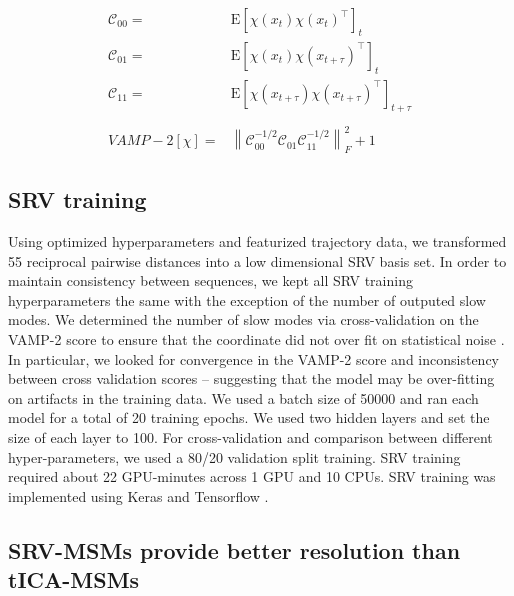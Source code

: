 \documentclass[journal=jpcbfk,manuscript=article]{achemso}
\newcommand{\Expect}[1]{\mathrm{E}\left[#1\right]}
\newcommand{\norm}[1]{\left\lVert#1\right\rVert}
\begin{document}
\begin{align*}
 	\mathscr{C}_{00}=&\Expect{\chi(x_t)\chi(x_t)^\intercal}_t\\
 	\mathscr{C}_{01}=&\Expect{\chi(x_t)\chi(x_{t+\tau})^\intercal}_t\\
 	\mathscr{C}_{11}=&\Expect{\chi(x_{t+\tau})\chi(x_{t+\tau})^\intercal}_{t+\tau}\\
	\\
 	VAMP-2[\chi]=&\norm{\mathscr{C}_{00}^{-1/2}\mathscr{C}_{01}\mathscr{C}_{11}^{-1/2}}_F^2 +1
\end{align*}\label{CK1}

\subsection{SRV training}

Using optimized hyperparameters and featurized trajectory data, we transformed 55 reciprocal pairwise distances into a low dimensional SRV basis set. In order to maintain consistency between sequences, we kept all SRV training hyperparameters the same with the exception of the number of outputed slow modes. We determined the number of slow modes via cross-validation on the VAMP-2 score to ensure that the coordinate did not over fit on statistical noise \citep{McGibbon2015VariationalKinetics}. In particular, we looked for convergence in the VAMP-2 score and inconsistency between cross validation scores -- suggesting that the model may be over-fitting on artifacts in the training data. We used a batch size of 50000 and ran each model for a total of 20 training epochs. We used two hidden layers and set the size of each layer to 100. For cross-validation and comparison between different hyper-parameters, we used a 80/20 validation split training. SRV training required about 22 GPU-minutes across 1 GPU and 10 CPUs. SRV training was implemented using Keras and Tensorflow \citep{KerasGithub.Com, Abadi2016TensorFlow:Systems}.

\subsection{SRV-MSMs provide better resolution than tICA-MSMs} 
\end{document}
